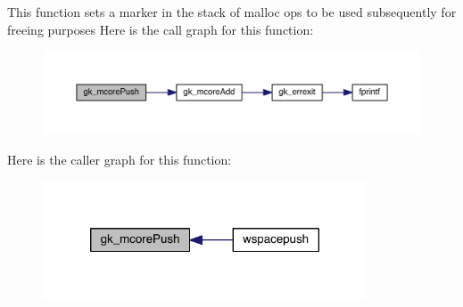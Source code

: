 This function sets a marker in the stack of malloc ops to be used subsequently for freeing purposes Here is the call graph for this function\+:\nopagebreak
\begin{figure}[H]
\begin{center}
\leavevmode
\includegraphics[width=350pt]{a00107_a07579694837248c1f2908860edc643c0_cgraph}
\end{center}
\end{figure}
Here is the caller graph for this function\+:\nopagebreak
\begin{figure}[H]
\begin{center}
\leavevmode
\includegraphics[width=272pt]{a00107_a07579694837248c1f2908860edc643c0_icgraph}
\end{center}
\end{figure}
